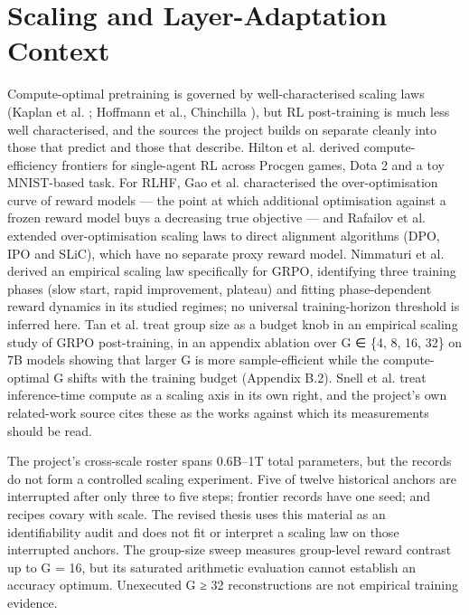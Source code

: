 \documentclass[12pt,a4paper]{report}
\begin{document}
\section{Scaling and Layer-Adaptation
Context}\label{scaling-and-layer-adaptation-context}

Compute-optimal pretraining is governed by well-characterised scaling
laws (Kaplan et al. \citep{kaplan2020scaling}; Hoffmann et al.,
Chinchilla \citep{hoffmann2022chinchilla}), but RL post-training is much
less well characterised, and the sources the project builds on separate
cleanly into those that predict and those that describe. Hilton et al.
\citep{hilton2023rlscaling} derived compute-efficiency frontiers for
single-agent RL across Procgen games, Dota 2 and a toy MNIST-based task.
For RLHF, Gao et al. \citep{gao2023scaling} characterised the
over-optimisation curve of reward models --- the point at which
additional optimisation against a frozen reward model buys a decreasing
true objective --- and Rafailov et al. \citep{rafailov2024rlhfscaling}
extended over-optimisation scaling laws to direct alignment algorithms
(DPO, IPO and SLiC), which have no separate proxy reward model.
Nimmaturi et al. \citep{nimmaturi2025predictive} derived an empirical
scaling law specifically for GRPO, identifying three training phases
(slow start, rapid improvement, plateau) and fitting phase-dependent
reward dynamics in its studied regimes; no universal training-horizon
threshold is inferred here. Tan et al. \citep{tan2025scalingrl} treat
group size as a budget knob in an empirical scaling study of GRPO
post-training, in an appendix ablation over G ∈ \{4, 8, 16, 32\} on 7B
models showing that larger G is more sample-efficient while the
compute-optimal G shifts with the training budget (Appendix B.2). Snell
et al. \citep{snell2024testtime} treat inference-time compute as a
scaling axis in its own right, and the project's own related-work source
cites these as the works against which its measurements should be read.

The project's cross-scale roster spans 0.6B--1T total parameters, but
the records do not form a controlled scaling experiment. Five of twelve
historical anchors are interrupted after only three to five steps;
frontier records have one seed; and recipes covary with scale. The
revised thesis uses this material as an identifiability audit and does
not fit or interpret a scaling law on those interrupted anchors. The
group-size sweep measures group-level reward contrast up to G = 16, but
its saturated arithmetic evaluation cannot establish an accuracy
optimum. Unexecuted G ≥ 32 reconstructions are not empirical training
evidence.
\end{document}
